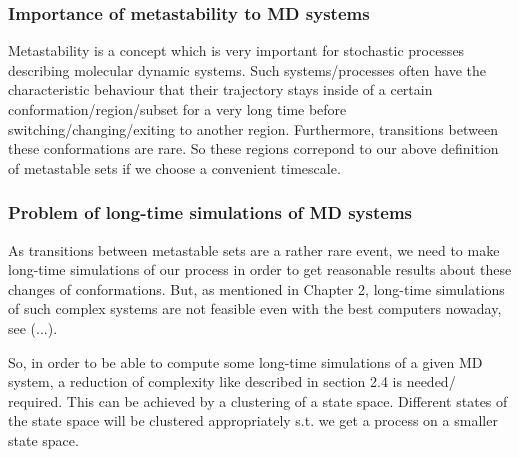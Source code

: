 
\subsubsection*{Importance of metastability to MD systems}

Metastability is a concept which is very important for stochastic processes describing molecular dynamic systems.
Such systems/processes often have the characteristic behaviour that their trajectory stays inside of a certain conformation/region/subset for a very long time before switching/changing/exiting to another region. Furthermore, transitions between these conformations are rare. 
So these regions correpond to our above definition of metastable sets if we choose a convenient timescale.

\subsubsection*{Problem of long-time simulations of MD systems}



As transitions between metastable sets are a rather rare event, we need to make long-time simulations of our process in order to get reasonable results about these changes of conformations.
But, as mentioned in Chapter 2, long-time simulations of such complex systems are not feasible even with the best computers nowaday, see (...).

So, in order to be able to compute some long-time simulations of a given MD system, a reduction of complexity like described in section 2.4 is needed/ required. This can be achieved by a clustering of a state space. Different states of the state space will be clustered appropriately s.t. we get a process on a smaller state space.


